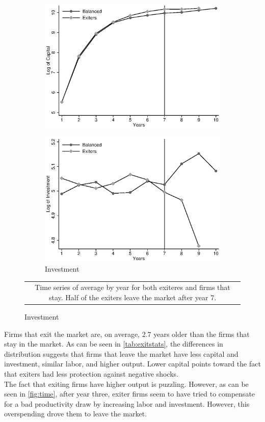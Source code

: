 \documentclass[11pt]{article}
\begin{document}
\begin{figure}[ht]
\begin{subfigure}[b]{.3\textwidth}
		\includegraphics[width=\textwidth]{./timeK.eps}
	\end{subfigure}
	\begin{subfigure}[b]{.3\textwidth}
		\centering
		\caption{Investment}
		\includegraphics[width=\textwidth]{./timeI.eps}
	\end{subfigure}
\begin{tabular*}{1\textwidth}{c}
	\multicolumn{1}{p{1\hsize}}{\footnotesize Time series of average by year for both exiteres and firms that stay. Half of the exiters leave the market after year 7.}\\
\end{tabular*}      	  
\end{figure}

Firms that exit the market are, on average, 2.7 years older than the firms that stay in the market. As can be seen in \autoref{tab:exitstats}, the differences in distribution suggests that firms that leave the market have less capital and investment, similar labor, and higher output. Lower capital points toward the fact that exiters had less protection against negative shocks. \\
The fact that exiting firms have higher output is puzzling. However, as can be seen in \autoref{fig:time}, after year three, exiter firms seem to have tried to compensate for a bad productivity draw by increasing labor and investment. However, this overspending drove them to leave the market.
\end{document}
